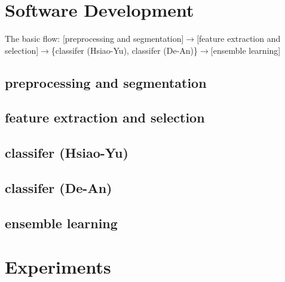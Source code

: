 \section{Software Development}

The basic flow: [preprocessing and segmentation]$\rightarrow$[feature extraction and selection]$\rightarrow$\{classifer (Hsiao-Yu), classifer (De-An)\}$\rightarrow$[ensemble learning]

\subsection{preprocessing and segmentation}



\subsection{feature extraction and selection}



\subsection{classifer (Hsiao-Yu)}


\subsection{classifer (De-An)}


\subsection{ensemble learning}



\section{Experiments}


